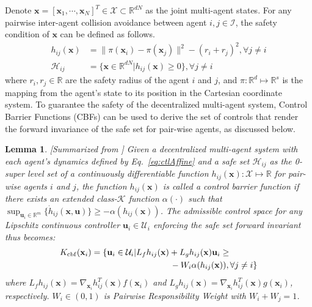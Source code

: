 \documentclass[letterpaper, 10 pt, conference]{ieeeconf}
\theoremstyle{plain}
\newtheorem{lemma}[theorem]{Lemma}
\begin{document}
Denote $\mathbf{x} = [\mathbf{x}_1, \cdots, \mathbf{x}_N]^{T} \in \mathcal{X} \subset \mathbb{R}^{dN}$ as the joint multi-agent states. For any pairwise inter-agent collision avoidance between agent
$i,j \in \mathcal{I}$, the safety condition of $\mathbf{x}$ can be defined as follows.
\begin{align}
h_{ij}(\mathbf{x}) &= \| \pi(\mathbf{x}_i) - \pi(\mathbf{x}_j) \|^{2} - (r_i + r_j) ^2, \forall j \neq i \label{eq:hij}\\
\mathcal{H}_{ij} &= \{\mathbf{x} \in \mathbb{R}^{dN} | h_{ij}(\mathbf{x}) \geq 0\}, \forall j \neq i
\end{align}
where $r_i, r_j \in \mathbb{R}$ are the safety radius of the agent $i$ and $j$, and
$\pi:\mathbb{R}^d \mapsto \mathbb{R}^{s}$
is the mapping from the agent's state to its position in the Cartesian coordinate system.
To guarantee the safety of the decentralized multi-agent system, Control Barrier Functions (CBFs) \cite{ames2014control, wang2017safety, luo2020multi} can be used to derive the set of controls that render the forward invariance of the safe set
for pair-wise agents, as discussed below.




\begin{lemma}\label{lem:de_cbf}[Summarized from \cite{ames2014control, lyu2023risk}]
Given a decentralized multi-agent system with each agent's dynamics defined by Eq.~\eqref{eq:ctlAffine} and a safe set $\mathcal{H}_{ij}$ as the 0-super level set of a continuously differentiable function $h_{ij}(\mathbf{x}): \mathcal{X}\mapsto \mathbb{R}$ for pair-wise agents $i$ and $j$, 
the function $h_{ij}(\mathbf{x})$ is called a control barrier function if there exists an extended class-$\mathcal{K}$ function $\alpha(\cdot)$ such that $\sup_{\mathbf{u}_i \in \mathbb{R}^m}\{\dot{h}_{ij}(\mathbf{x}, \mathbf{u})\}\geq -\alpha(h_{ij}(\mathbf{x}))$.
The admissible control space for any Lipschitz continuous
controller $\mathbf{u}_i \in \mathcal{U}_i$ enforcing the safe set forward invariant thus becomes:
{\small
\begin{align}\label{eq:de_cbc_lemma}
    K_\mathrm{cbf}(\mathbf{x}_i) = \{ \mathbf{u}_i\in \mathcal{U}_i | &L_f h_{ij}(\mathbf{x}) + L_gh_{ij}(\mathbf{x})\mathbf{u}_i  \geq \notag \\
&\qquad \qquad  - W_i \alpha(h_{ij}(\mathbf{x})), \forall j \neq i \}
\end{align}}
where $L_f h_{ij}(\mathbf{x}) = 
\nabla_{\mathbf{x}_i} h_{ij}^{T}(\mathbf{x}) 
f(\mathbf{x}_i)$ and
$L_g h_{ij}(\mathbf{x}) =  \nabla_{\mathbf{x}_i} h_{ij}^{T}(\mathbf{x})g(\mathbf{x}_i)$, respectively.
$W_i \in (0,1)$ is Pairwise Responsibility Weight with $W_i + W_j = 1$.
\end{lemma}
\end{document}
